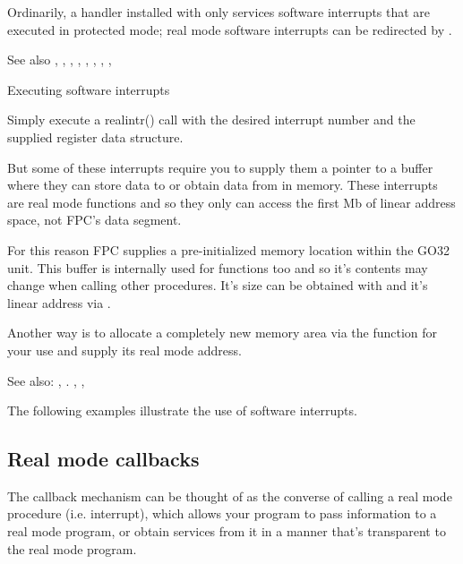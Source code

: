 Ordinarily, a handler installed with
 only services software
interrupts that are executed in protected mode; real mode software
interrupts can be redirected by .

See also , 
,
,
, 
, 
, 
, 
,

Executing software interrupts

Simply execute a realintr() call with the desired interrupt number and the
supplied register data structure.

But some of these interrupts require you to supply them a pointer to a
buffer where they can store data to or obtain data from in memory. These
interrupts are real mode functions and so they only can access the first Mb
of linear address space, not FPC's data segment.

For this reason FPC supplies a pre-initialized \dos memory location within
the GO32 unit. This buffer is internally used for \dos functions too and so
it's contents may change when calling other procedures. It's size can be
obtained with  and it's linear address via 
.

Another way is to allocate a completely new \dos memory area via the
 function for your use and 
supply its real mode address.

See also:
,
.
,
,

The following examples illustrate the use of software interrupts.

\html{}

\html{}

\subsection{Real mode callbacks}

The callback mechanism can be thought of as the converse of calling a real
mode procedure (i.e. interrupt), which allows your program to pass
information to a real mode program, or obtain services from it in a manner
that's transparent to the real mode program.

